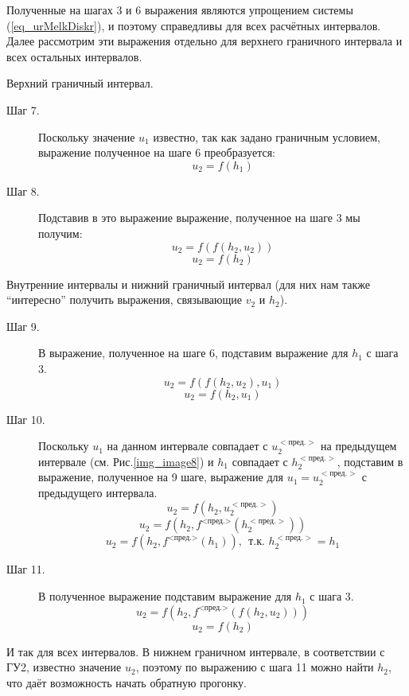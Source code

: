 Полученные на шагах 3 и 6 выражения являются упрощением системы (\ref{eq_urMelkDiskr}), и поэтому справедливы для всех расчётных интервалов. Далее рассмотрим эти выражения отдельно для верхнего граничного интервала и всех остальных интервалов.

\vspace{0.5cm}

Верхний граничный интервал.

\begin{description}

\item[Шаг 7.] Поскольку значение $u_1$ известно, так как задано граничным условием, выражение полученное на шаге 6 преобразуется:
$$
  u_2 = f(h_1)
$$

\item[Шаг 8.] Подставив в это выражение выражение, полученное на шаге 3 мы получим:
$$
  u_2 = f(f(h_2, u_2)) 
$$
$$
  u_2 = f(h_2)
$$

\end{description}

\vspace{0.5cm}

Внутренние интервалы и нижний граничный интервал (для них нам также ``интересно''  получить выражения, связывающие $v_2$ и $h_2$).

\begin{description}

\item[Шаг 9.] В выражение, полученное на шаге 6, подставим выражение для $h_1$ с шага 3.
$$
  u_2 = f(f(h_2, u_2), u_1)
$$
$$
  u_2 = f(h_2, u_1)
$$

\item[Шаг 10.] Поскольку $u_1$ на данном интервале совпадает с $u_2^{<\textrm{пред.}>}$ на предыдущем интервале (см. Рис.\ref{img_image8}) и $h_1$ совпадает с $h_2^{<\textrm{пред.}>}$, подставим в выражение, полученное на 9 шаге, выражение для $u_1 = u_2^{<\textrm{пред.}>}$ с предыдущего интервала.
$$
  u_2 = f(h_2, u_2^{<\textrm{пред.}>})
$$
$$
  u_2 = f(h_2, f^{\textrm{<пред.>}}(h_2^{<\textrm{пред.}>}))
$$
$$
  u_2 = f(h_2, f^{\textrm{<пред.>}}(h_1)),\ \ \textrm{т.к. } h_2^{<\textrm{пред.}>} = h_1
$$

\item[Шаг 11.] В полученное выражение подставим выражение для $h_1$ с шага 3.
$$
  u_2 = f(h_2, f^{\textrm{<пред.>}}(f(h_2, u_2)))
$$
$$
  u_2 = f(h_2)
$$
\end{description}

И так для всех интервалов. В нижнем граничном интервале, в соответствии с ГУ2, известно значение $u_2$, поэтому по выражению с шага 11 можно найти $h_2$, что даёт возможность начать обратную прогонку.

